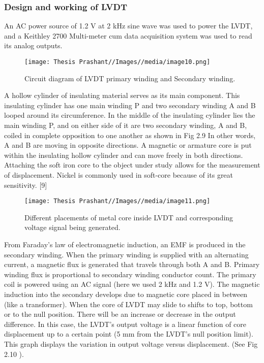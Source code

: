 \subsubsection{Design and working of LVDT}
An AC power source of 1.2 V at 2 kHz sine wave was used to power the LVDT, and a Keithley
2700 Multi-meter cum data acquisition system was used to read its analog outputs.
\begin{figure}
    \centering
    \texttt{[image: Thesis Prashant//Images//media/image10.png]}
    \caption{Circuit diagram of LVDT primary winding and Secondary winding.}
    \label{fig:enter-label}
\end{figure}
A hollow cylinder of insulating material serves as its main component. This insulating cylinder has one main winding P and two secondary winding A and B looped around its circumference. In the middle of the insulating cylinder lies the main winding P, and on either side of it are two secondary winding, A and B, coiled in complete opposition to one another as shown in Fig 2.9 In other words, A and B are moving in opposite directions. A magnetic or armature core is put within the insulating hollow cylinder and can move freely in both directions. Attaching the soft iron core to the object under study allows for the measurement of displacement. Nickel is commonly used in soft-core because of its great sensitivity. [9]
\begin{figure}
    \centering
    \texttt{[image: Thesis Prashant//Images//media/image11.png]}
    \caption{Different placements of metal core inside LVDT and corresponding voltage signal
being generated.}
    \label{fig:enter-label}
\end{figure}

From Faraday’s law of electromagnetic induction, an EMF is produced in the secondary winding. When the primary winding is supplied with an alternating current, a magnetic flux is generated that travels through both A and B. Primary winding flux is proportional to secondary winding conductor count. The primary coil is powered using an AC signal (here we used 2 kHz and 1.2 V). The magnetic induction into the secondary develops due to magnetic core placed in between (like a transformer). When the core of LVDT may slide to shifts to top, bottom or to the null position. There will be an increase or decrease in the output difference. In this case, the LVDT's output voltage is a linear function of core displacement up
to a certain point (5 mm from the LVDT's null position limit). This graph displays the variation in output voltage versus displacement. (See Fig 2.10 ).

